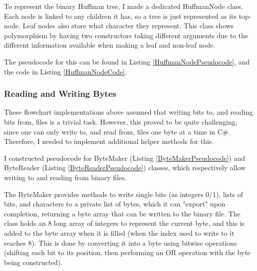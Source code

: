 \documentclass[../main.tex]{subfiles}
\begin{document}
\FloatBarrier

\FloatBarrier

To represent the binary Huffman tree, I made a dedicated HuffmanNode class. Each node is linked to any children it has, so a tree is just represented as its top-node. Leaf nodes also store what character they represent. This class shows polymorphism by having two constructors taking different arguments due to the different information available when making a leaf and non-leaf node.

The pseudocode for this can be found in Listing \ref{HuffmanNodePseudocode}, and the code in Listing \ref{HuffmanNodeCode}.

\FloatBarrier

\FloatBarrier

\FloatBarrier

\FloatBarrier

\subsubsection{Reading and Writing Bytes}

These flowchart implementations above assumed that writing bits to, and reading bits from, files is a trivial task. However, this proved to be quite challenging, since one can only write to, and read from, files one byte at a time in C\#. Therefore, I needed to implement additional helper methods for this.

I constructed pseudocode for ByteMaker (Listing \ref{ByteMakerPseudocode}) and ByteReader (Listing \ref{ByteReaderPseudocode}) classes, which respectively allow writing to and reading from binary files.

\FloatBarrier

\FloatBarrier

The ByteMaker provides methods to write single bits (as integers 0/1), lists of bits, and characters to a private list of bytes, which it can "export" upon completion, returning a byte array that can be written to the binary file. The class holds an 8 long array of integers to represent the current byte, and this is added to the byte array when it is filled (when the index used to write to it reaches 8). This is done by converting it into a byte using bitwise operations (shifting each bit to its position, then performing an OR operation with the byte being constructed).
\end{document}
